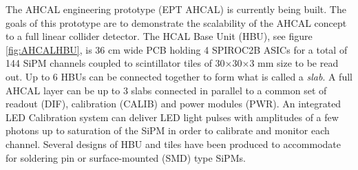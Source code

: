 The AHCAL engineering prototype (EPT AHCAL) \cite{Felix:ProtoAHCAL} is currently being built. The goals of this prototype are to demonstrate the scalability of the AHCAL concept to a full linear collider detector. The HCAL Base Unit (HBU), see figure \ref{fig:AHCALHBU}, is 36 cm wide PCB holding 4 SPIROC2B ASICs for a total of 144 SiPM channels coupled to scintillator tiles of 30$\times$30$\times$3 mm size to be read out. Up to 6 HBUs can be connected together to form what is called a \textit{slab}. A full AHCAL layer can be up to 3 slabs connected in parallel to a common set of readout (DIF), calibration (CALIB) and power modules (PWR). An integrated LED Calibration system can deliver LED light pulses with amplitudes of a few photons up to saturation of the SiPM in order to calibrate and monitor each channel. Several designs of HBU and tiles have been produced to accommodate for soldering pin or surface-mounted (SMD) type SiPMs.

